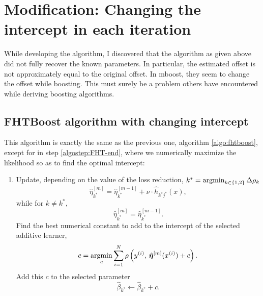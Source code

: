 
\section{Modification: Changing the intercept in each iteration}
While developing the algorithm, I discovered that the algorithm as given above did not fully recover the known parameters.
In particular, the estimated offset is not approximately equal to the original offset.
In mboost, they seem to change the offset while boosting.
This must surely be a problem others have encountered while deriving boosting algorithms.

\subsection{FHTBoost algorithm with changing intercept}\label{subsec:FHT-intercept}
This algorithm is exactly the same as the previous one, algorithm \ref{algo:fhtboost}, except for in step \ref{algostep:FHT-end}, 
where we numerically maximize the likelihood so as to find the optimal intercept:
\label{algo:fhtboost-with-intercept}
\begin{enumerate}
    \item
        Update, depending on the value of the loss reduction, $k^*=\operatorname*{argmin}_{k\in\{1,2\}}\Delta\rho_k$
        \begin{equation}
            \hat{\eta}^{[m]}_{k^*}=\hat{\eta}^{[m-1]}_{k^*}+\nu\cdot\hat{h}_{k^*j^*}(x),
        \end{equation}
        while for $k\neq k^*$,
        \begin{equation}
            \hat{\eta}^{[m]}_{k^*}=\hat{\eta}^{[m-1]}_{k^*}.
        \end{equation}
        Find the best numerical constant to add to the intercept of the selected additive learner,
        \begin{equation}
            c=\operatorname*{argmin}_c \sum_{i=1}^N\rho\left(y^{(i)},\,\hat{\boldsymbol{\eta}}^{[m]}(x^{(i)}) + c \right).
        \end{equation}
        Add this $c$ to the selected parameter
        \begin{equation}
            \hat{\beta}_{k^*}\gets\hat{\beta}_{k^*}+c.
        \end{equation}
\end{enumerate}

